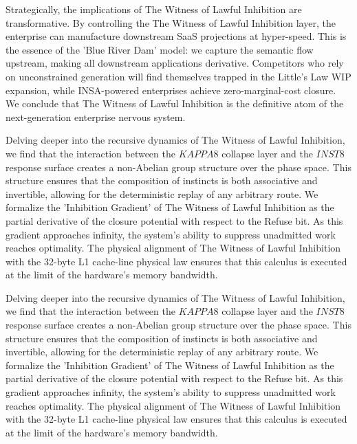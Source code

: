\documentclass[12pt,a4paper,oneside]{book}
\begin{document}
Strategically, the implications of The Witness of Lawful Inhibition are transformative. By controlling the The Witness of Lawful Inhibition layer, the enterprise can manufacture downstream SaaS projections at hyper-speed. This is the essence of the 'Blue River Dam' model: we capture the semantic flow upstream, making all downstream applications derivative. Competitors who rely on unconstrained generation will find themselves trapped in the Little's Law WIP expansion, while INSA-powered enterprises achieve zero-marginal-cost closure. We conclude that The Witness of Lawful Inhibition is the definitive atom of the next-generation enterprise nervous system. 

Delving deeper into the recursive dynamics of The Witness of Lawful Inhibition, we find that the interaction between the $KAPPA8$ collapse layer and the $INST8$ response surface creates a non-Abelian group structure over the phase space. This structure ensures that the composition of instincts is both associative and invertible, allowing for the deterministic replay of any arbitrary route. We formalize the 'Inhibition Gradient' of The Witness of Lawful Inhibition as the partial derivative of the closure potential with respect to the Refuse bit. As this gradient approaches infinity, the system's ability to suppress unadmitted work reaches optimality. The physical alignment of The Witness of Lawful Inhibition with the 32-byte L1 cache-line physical law ensures that this calculus is executed at the limit of the hardware's memory bandwidth. 

Delving deeper into the recursive dynamics of The Witness of Lawful Inhibition, we find that the interaction between the $KAPPA8$ collapse layer and the $INST8$ response surface creates a non-Abelian group structure over the phase space. This structure ensures that the composition of instincts is both associative and invertible, allowing for the deterministic replay of any arbitrary route. We formalize the 'Inhibition Gradient' of The Witness of Lawful Inhibition as the partial derivative of the closure potential with respect to the Refuse bit. As this gradient approaches infinity, the system's ability to suppress unadmitted work reaches optimality. The physical alignment of The Witness of Lawful Inhibition with the 32-byte L1 cache-line physical law ensures that this calculus is executed at the limit of the hardware's memory bandwidth. 
\end{document}
